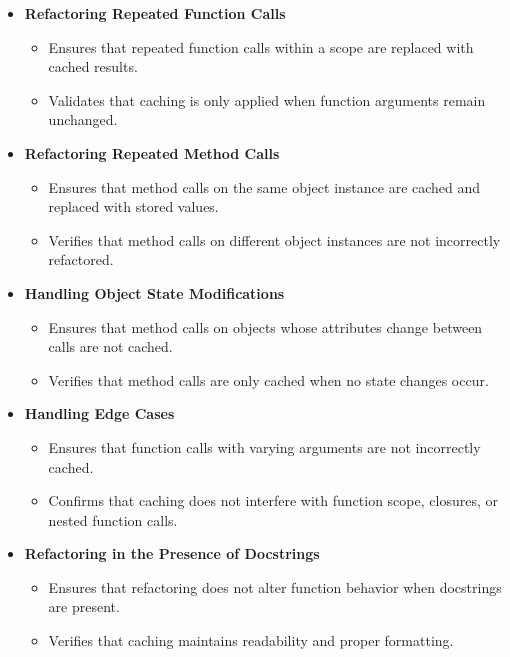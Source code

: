 \documentclass[12pt, titlepage]{article}
\begin{document}
  \begin{itemize}
    \item \textbf{Refactoring Repeated Function Calls}
      \begin{itemize}
        \item Ensures that repeated function calls within a scope are
          replaced with cached results.
        \item Validates that caching is only applied when function
          arguments remain unchanged.
      \end{itemize}

    \item \textbf{Refactoring Repeated Method Calls}
      \begin{itemize}
        \item Ensures that method calls on the same object instance
          are cached and replaced with stored values.
        \item Verifies that method calls on different object
          instances are not incorrectly refactored.
      \end{itemize}

    \item \textbf{Handling Object State Modifications}
      \begin{itemize}
        \item Ensures that method calls on objects whose attributes
          change between calls are not cached.
        \item Verifies that method calls are only cached when no
          state changes occur.
      \end{itemize}

    \item \textbf{Handling Edge Cases}
      \begin{itemize}
        \item Ensures that function calls with varying arguments are
          not incorrectly cached.
        \item Confirms that caching does not interfere with function
          scope, closures, or nested function calls.
      \end{itemize}

    \item \textbf{Refactoring in the Presence of Docstrings}
      \begin{itemize}
        \item Ensures that refactoring does not alter function
          behavior when docstrings are present.
        \item Verifies that caching maintains readability and proper formatting.
      \end{itemize}


\end{itemize}
\end{document}
